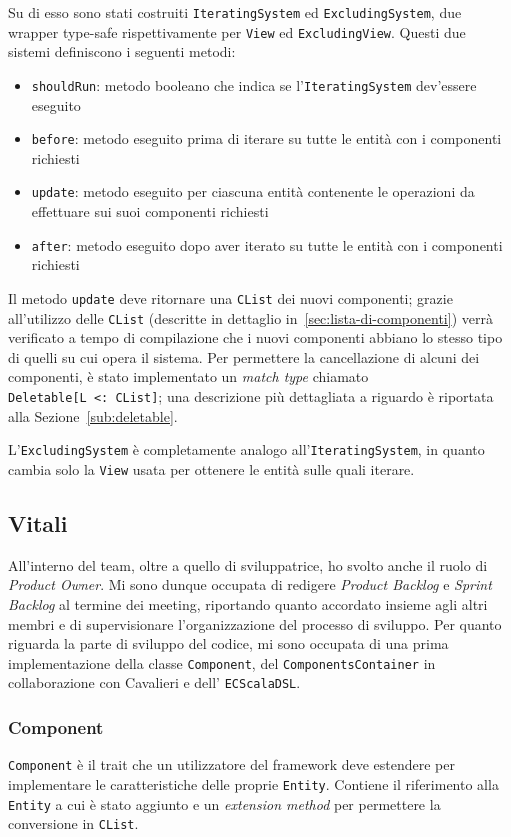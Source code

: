 Su di esso sono stati costruiti \texttt{IteratingSystem} ed \texttt{ExcludingSystem}, due wrapper type-safe
rispettivamente per \texttt{View} ed \texttt{ExcludingView}.
Questi due sistemi definiscono i seguenti metodi:
\begin{itemize}
    \item \texttt{shouldRun}: metodo booleano che indica se l'\texttt{IteratingSystem} dev'essere eseguito
    \item \texttt{before}: metodo eseguito prima di iterare su tutte le entità con i componenti richiesti
    \item \texttt{update}: metodo eseguito per ciascuna entità contenente le operazioni da effettuare sui suoi
    componenti richiesti
    \item \texttt{after}: metodo eseguito dopo aver iterato su tutte le entità con i componenti richiesti
\end{itemize}

Il metodo \texttt{update} deve ritornare una \texttt{CList} dei nuovi componenti;
grazie all'utilizzo delle \texttt{CList} (descritte in dettaglio in~\ref{sec:lista-di-componenti}) verrà verificato a
tempo di compilazione che i nuovi componenti abbiano lo stesso tipo di quelli su cui opera il sistema.
Per permettere la cancellazione di alcuni dei componenti, è stato implementato un \textit{match type} chiamato
\texttt{Deletable[L~<:~CList]}; una descrizione più dettagliata a riguardo è riportata alla Sezione~\ref{sub:deletable}.

L'\texttt{ExcludingSystem} è completamente analogo all'\texttt{IteratingSystem}, in quanto cambia solo la \texttt{View}
usata per ottenere le entità sulle quali iterare.

\subsection{Vitali}\label{subsec:linda-vitali}
All'interno del team, oltre a quello di sviluppatrice, ho svolto anche il ruolo di \textit{Product Owner}.
Mi sono dunque occupata di redigere \textit{Product Backlog} e \textit{Sprint Backlog} al termine dei meeting, riportando quanto accordato
insieme agli altri membri e di supervisionare l'organizzazione del processo di sviluppo.
Per quanto riguarda la parte di sviluppo del codice, mi sono occupata di una prima implementazione della classe \texttt{Component},
del \texttt{ComponentsContainer} in collaborazione con Cavalieri e dell' \texttt{ECScalaDSL}.

\subsubsection{Component}\label{subsubsec:component-desc}
\texttt{Component} è il trait che un utilizzatore del framework deve estendere per implementare le caratteristiche delle
proprie \texttt{Entity}.
Contiene il riferimento alla \texttt{Entity} a cui è stato aggiunto e un \textit{extension method} per permettere la conversione
in \texttt{CList}.

